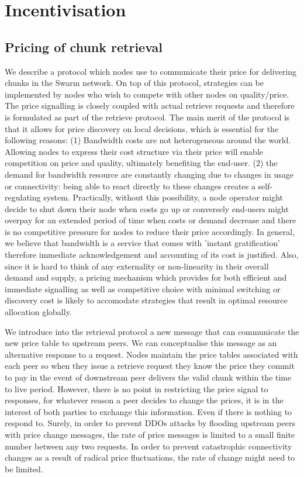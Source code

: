 \documentclass[a4paper,10pt,fullpage]{article}
\numberwithin{equation}{section}
\theoremstyle{definition}
\begin{document}
\section{Incentivisation}

\subsection{Pricing of chunk retrieval}

We describe a protocol which nodes use to communicate their price for delivering chunks in the Swarm network. On top of this protocol, strategies can be implemented by nodes who wish to compete with other nodes on quality/price. 
The price signalling is closely coupled with actual retrieve requests and therefore is formulated as part of the retrieve protocol. The main merit of the protocol is that it allows for price discovery on local decisions, which is essential for the following reasons:
(1) Bandwidth costs are not heterogeneous around the world. Allowing nodes to express their cost structure via their price will enable competition on price and quality, ultimately benefiting the end-user. (2) the demand for bandwidth resource are constantly changing due to changes in usage or connectivity: being able to react directly to these changes creates a self-regulating system. 
Practically, without this possibility, a node operator might decide to shut down their node when costs go up or conversely end-users might overpay for an extended period of time when costs or demand decrease and there is no competitive pressure for nodes to reduce their price accordingly. In general, we believe that bandwidth is a service that comes with 'instant gratification' therefore immediate acknowledgement and accounting of its cost is justified. Also, since it is hard to think of any externality or non-linearity in their overall demand and supply, a pricing mechanism which provides for both efficient and immediate signalling as well as competitive choice with minimal switching or discovery cost is likely to accomodate strategies that result in optimal resource allocation globally.

We introduce into the retrieval protocol a new message that can communicate the new price table to upstream peers. We can conceptualise this message as an alternative response to a request. Nodes maintain the price tables associated with each peer so when they issue a retrieve request they know the price they commit to pay in the event of downstream peer delivers the valid chunk within the time to live period.
However, there is no point in restricting the price signal to responses, for whatever reason a peer decides to change the prices, it is in the interest of both parties to exchange this information. Even if there is nothing to respond to. Surely, in order to prevent DDOs attacks by flooding upstream peers with price change messages, the rate of price messages is limited to a small finite number between any two requests. In order to prevent catastrophic connectivity changes as a result of radical price fluctuations, the rate of change might need to be limited.
\end{document}
